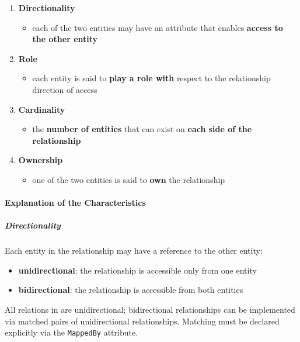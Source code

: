 \documentclass[english]{article}
\begin{document}
\begin{enumerate}
  \item \textbf{Directionality}
        \begin{itemize}[label=\(\rightarrow\)]
          \item each of the two entities may have an attribute that enables \textbf{access to the other entity}
        \end{itemize}
  \item \textbf{Role}
        \begin{itemize}[label=\(\rightarrow\)]
          \item each entity is said to \textbf{play a role with} respect to the relationship direction of access
        \end{itemize}
  \item \textbf{Cardinality}
        \begin{itemize}[label=\(\rightarrow\)]
          \item the \textbf{number of entities} that can exist on \textbf{each side of the relationship}
        \end{itemize}
  \item \textbf{Ownership}
        \begin{itemize}[label=\(\rightarrow\)]
          \item one of the two entities is said to \textbf{own} the relationship
        \end{itemize}
\end{enumerate}

\paragraph{Explanation of the Characteristics}

\subparagraph*{Directionality}
Each entity in the relationship may have a reference to the other entity:

\begin{itemize}
  \item \textbf{unidirectional}: the relationship is accessible only from one entity
  \item \textbf{bidirectional}: the relationship is accessible from both entities
\end{itemize}

All relations in \jpa are unidirectional;
bidirectional relationships can be implemented via matched pairs of unidirectional relationships.
Matching must be declared explicitly via the \texttt{MappedBy} attribute.
\end{document}
